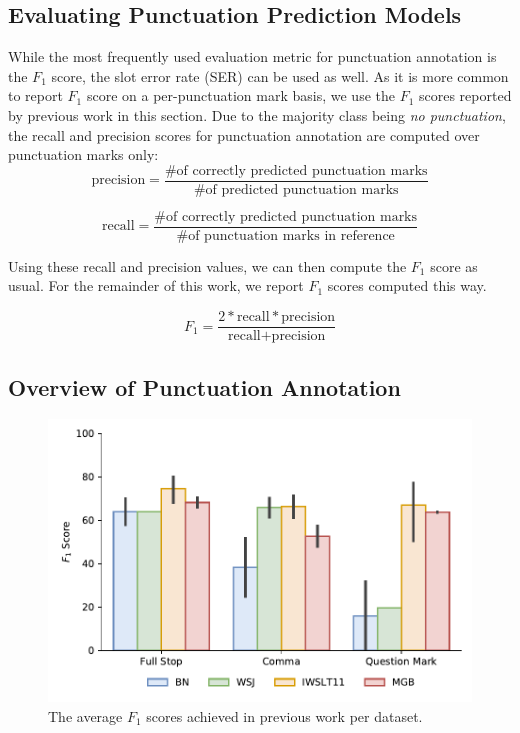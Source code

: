 \documentclass[bsc,deptreport,ai]{infthesis} %
\begin{document}
\subsection{Evaluating Punctuation Prediction Models}
\label{sec:eval}
While the most frequently used evaluation metric for punctuation annotation is the $F_1$ score, the slot error rate (SER) can be used as well. As it is more common to report $F_1$ score on a per-punctuation mark basis, we use the $F_1$ scores reported by previous work in this section. Due to the majority class being \emph{no punctuation}, the recall and precision scores for punctuation annotation are computed over punctuation marks only: $$\text{precision}=\frac{\text{\# of correctly predicted punctuation marks}}{\text{\# of predicted punctuation marks}}$$

$$\text{recall}=\frac{\text{\# of correctly predicted punctuation marks}}{\text{\# of punctuation marks in reference}}$$

Using these recall and precision values, we can then compute the $F_1$ score as usual. For the remainder of this work, we report $F_1$ scores computed this way.

$$F_1 = \frac{2*\text{recall}*\text{precision}}{\text{recall}+\text{precision}}$$

\subsection{Overview of Punctuation Annotation}
\begin{figure}
\centering
\includegraphics[width=.8\textwidth]{dataset_punctuation_new(1).pdf}
\caption{The  average $F_1$ scores achieved in previous work per dataset.}
\label{fig:datasetf1}
\end{figure}
\end{document}
